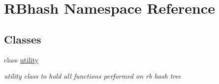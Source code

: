 \hypertarget{namespace_r_bhash}{\section{R\-Bhash Namespace Reference}
\label{namespace_r_bhash}
}
\subsection*{Classes}
\begin{DoxyCompactItemize}
\item 
class \hyperlink{class_r_bhash_1_1utility}{utility}
\begin{DoxyCompactList}\small\item\em utility class to hold all functions performed on rb hash tree \end{DoxyCompactList}\end{DoxyCompactItemize}

